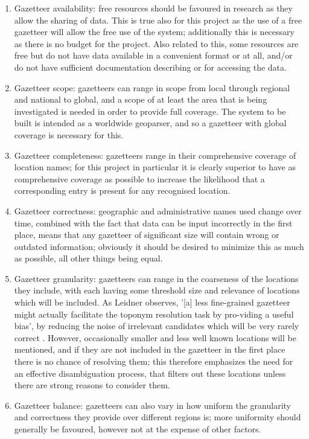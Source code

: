 \documentclass[12pt, a4paper]{report}
\begin{document}
\begin{enumerate}
	\item { Gazetteer availability: free resources should be favoured in research as they allow the sharing of data. This is true also for this project as the use of a free gazetteer will allow the free use of the system; additionally this is necessary as there is no budget for the project. Also related to this, some resources are free but do not have data available in a convenient format or at all, and/or do not have sufficient documentation describing or for accessing the data.
	}
	\item { Gazetteer scope: gazetteers can range in scope from local through regional and national to global, and a scope of at least the area that is being investigated is needed in order to provide full coverage. The system to be built is intended as a worldwide geoparser, and so a gazetteer with global coverage is necessary for this. 
	}
	\item { Gazetteer completeness: gazetteers range in their comprehensive coverage of location names; for this project in particular it is clearly superior to have as comprehensive coverage as possible to increase the likelihood that a corresponding entry is present for any recognised location. 
	}
	\item { Gazetteer correctness: geographic and administrative names used change over time, combined with the fact that data can be input incorrectly in the first place, means that any gazetteer of significant size will contain wrong or outdated information; obviously it should be desired to minimize this as much as possible, all other things being equal.
	}
	\item { Gazetteer granularity: gazetteers can range in the coarseness of the locations they include, with each having some threshold size and relevance of locations which will be included. As Leidner observes, '[a] less fine-grained gazetteer might
actually facilitate the toponym resolution task by pro-viding a useful bias', by reducing the noise of irrelevant candidates which will be very rarely correct \citep{leidner2004}. However, occasionally smaller and less well known locations will be mentioned, and if they are not included in the gazetteer in the first place there is no chance of resolving them; this therefore emphasizes the need for an effective disambiguation process, that filters out these locations unless there are strong reasons to consider them. 
	}
	\item { Gazetteer balance: gazetteers can also vary in how uniform the granularity and correctness they provide over different regions is; more uniformity should generally be favoured, however not at the expense of other factors.
}
\end{enumerate}
\end{document}
